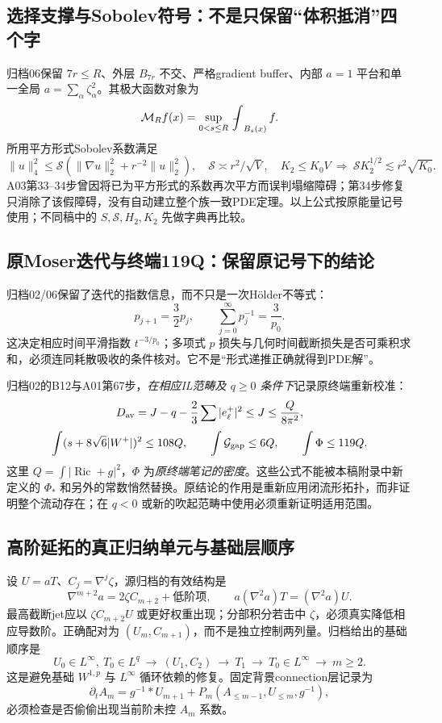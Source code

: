 \documentclass[UTF8,a4paper,11pt,fontset=fandol]{ctexart}
\numberwithin{equation}{section}
\theoremstyle{definition}
\newcommand{\Ric}{\operatorname{Ric}}
\newcommand{\fint}{\mathop{\rlap{\,\raisebox{0.1ex}{\tiny$-$}}\int}\nolimits}
\begin{document}
\subsection{选择支撑与Sobolev符号：不是只保留“体积抵消”四个字}
归档06保留 $7r\le R$、外层 $B_{7r}$ 不交、严格gradient buffer、内部 $a=1$ 平台和单一全局 $a=\sum_\alpha\zeta_\alpha^2$。其极大函数对象为
\[
\mathcal M_R f(x)=\sup_{0<s\le R}\fint_{B_s(x)}f.
\]
所用平方形式Sobolev系数满足
\[
\|u\|_4^2\le\mathcal S(\|\nabla u\|_2^2+r^{-2}\|u\|_2^2),\quad
\mathcal S\asymp r^2/\sqrt V,
\quad K_2\le K_0V\ \Longrightarrow\ \mathcal S K_2^{1/2}\lesssim r^2\sqrt{K_0}.
\]
A03第33--34步曾因将已为平方形式的系数再次平方而误判塌缩障碍；第34步修复只消除了该假障碍，没有自动建立整个族一致PDE定理。以上公式按原能量记号使用；不同稿中的 $S,\mathcal S,H_2,K_2$ 先做字典再比较。

\subsection{原Moser迭代与终端119Q：保留原记号下的结论}
归档02/06保留了迭代的指数信息，而不只是一次H\"older不等式：
\[
p_{j+1}=\frac32p_j,\qquad \sum_{j=0}^{\infty}p_j^{-1}=\frac3{p_0}.
\]
这决定相应时间平滑指数 $t^{-3/p_0}$；多项式 $p$ 损失与几何时间截断损失是否可乘积求和，必须连同耗散吸收的条件核对。它不是“形式递推正确就得到PDE解”。

归档02的B12与A01第67步，\emph{在相应IL范畴及 $q\ge0$ 条件下}记录原终端重新校准：
\[
D_{\rm av}=J-q-\frac23\sum|e_\ell^+|^2\le J\le\frac{Q}{8\pi^2},
\]
\[
\int(s+8\sqrt6|W^+|)^2\le108Q,\qquad
\int\mathcal G_{\rm gap}\le6Q,\qquad \int\Phi\le119Q.
\]
这里 $Q=\int|\Ric+g|^2$，$\Phi$ 为\emph{原终端笔记的密度}。这些公式不能被本稿附录中新定义的 $\Phi_*$ 和另外的常数悄然替换。原结论的作用是重新应用闭流形拓扑，而非证明整个流动存在；在 $q<0$ 或新的吹起范畴中使用必须重新证明适用范围。

\subsection{高阶延拓的真正归纳单元与基础层顺序}
设 $U=aT$、$C_j=\nabla^j\zeta$，源归档的有效结构是
\[
\nabla^{m+2}a=2\zeta C_{m+2}+\text{低阶项},\qquad
 a(\nabla^2a)T=(\nabla^2a)U.
\]
最高截断jet应以 $\zeta C_{m+2}U$ 或更好权重出现；分部积分若击中 $\zeta$，必须真实降低相应导数阶。正确配对为 $(U_m,C_{m+1})$，而不是独立控制两列量。归档给出的基础顺序是
\[
U_0\in L^\infty,\ T_0\in L^q
\ \longrightarrow\ (U_1,C_2)
\ \longrightarrow\ T_1
\ \longrightarrow\ T_0\in L^\infty
\ \longrightarrow\ m\ge2.
\]
这是避免基础 $W^{1,p}$ 与 $L^\infty$ 循环依赖的修复。固定背景connection层记录为
\[
\partial_t A_m=g^{-1}*U_{m+1}
+P_m(A_{\le m-1},U_{\le m},g^{-1}),
\]
必须检查是否偷偷出现当前阶未控 $A_m$ 系数。
\end{document}
